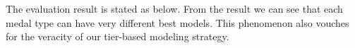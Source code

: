 \documentclass{mcmthesis}
\begin{document}
The evaluation result is stated as below. From the result we can see that each medal type can have very different best models. This phenomenon also vouches for the veracity of our tier-based modeling strategy.


    
    
    
\end{document}
